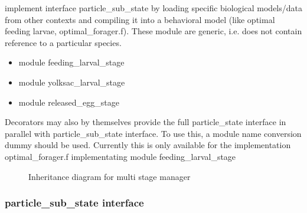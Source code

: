 implement interface particle\_sub\_state by loading specific 
  biological models/data from other contexts and compiling it into a
  behavioral model (like optimal feeding larvae, optimal\_forager.f).
  These module are generic, i.e. does not contain reference to a particular species.

  \begin{itemize}
  \item module feeding\_larval\_stage   
  \item module yolksac\_larval\_stage                    
  \item module released\_egg\_stage 
  \end{itemize}

  Decorators may also by themselves provide the full particle\_state interface in parallel
  with particle\_sub\_state interface. To use this, a module name conversion dummy should
  be used. Currently this is only available for the implementation optimal\_forager.f 
  implementating module feeding\_larval\_stage   


\begin{figure}[p]   %
\begin{center}                                                 
\end{center}                                                    
\caption{Inheritance diagram for multi stage manager}
\label{multistagemanager:fig}
\end{figure}


\subsubsection{particle\_sub\_state interface} 


